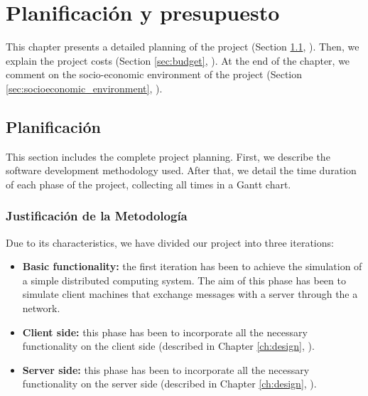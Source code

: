 \chead[]{}
\renewcommand{\headrulewidth}{0.5pt}

\lfoot[]{}
\cfoot[]{}
\rfoot[]{}
\renewcommand{\footrulewidth}{0pt}

\chapter{Planificación y presupuesto}
\label{ch:planning_and_budget}

This chapter presents a detailed planning of the project (Section \ref{sec:planning}, \textit{}). Then, we explain the project costs (Section \ref{sec:budget}, \textit{}). At the end of the chapter, we comment on the socio-economic environment of the project ({Section \ref{sec:socioeconomic_environment}, \textit{}}).

\section{Planificación}
\label{sec:planning}

This section includes the complete project planning. First, we describe the software development methodology used. After that, we detail the time duration of each phase of the project, collecting all times in a Gantt chart.

\subsection{Justificación de la Metodología}

Due to its characteristics, we have divided our project into three iterations:

\begin{itemize}

\item \textbf{Basic functionality:} the first iteration has been to achieve the simulation of a simple distributed computing system. The aim of this phase has been to simulate client machines that exchange messages with a server through the a network.

\item \textbf{Client side:} this phase has been to incorporate all the necessary functionality on the client side (described in Chapter \ref{ch:design}, \textit{}).

\item \textbf{Server side:} this phase has been to incorporate all the necessary functionality on the server side (described in Chapter \ref{ch:design}, \textit{}).

\end{itemize}

